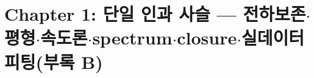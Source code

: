 \begin{abstract}
\noindent 본 문서는 흑연 음극 ICA($dQ/dV$) tail 이론 RB-series 재구성본 Chapter 1$\sim$5 를 한 문서로
통합한 것이다. \textbf{Chapter 1} 은 하나의 관찰(``저온$\cdot$고율에서 ICA peak 꼬리가 길어져 다음 peak 와
겹친다'')에서 출발해 열역학이 무대($V_n$, 평형 target $\xi_{\eq}$)를 깔고 동역학(진행률 완화 $+$
relaxation-length spectrum)이 꼬리의 주역임을 보이고, closure(Plan A/B)$\cdot$심플 근사식$\cdot$
\textbf{실데이터 피팅 워크플로(부록 B — 구 Chapter 6 흡수)}까지 본 장 안에서 닫는다. \textbf{Chapter 2}
는 그 위에서 전지 가역 반응열(평형 전위 온도계수 $=$ reaction entropy)과 비가역 소산열(과전압 flux$\times$force)을
Bernardi 에너지 balance 로 잇는다. \textbf{Chapter 3} 은 mobility $k_j$ 를 미시 forward/backward rate
$r_j^\pm$(Level B)로 확대하고 detailed balance 로 $n_j^{\eff}=RT/(Fw_j)$ 를 고정한다. \textbf{Chapter 4} 는
transition-level entropy production 이 거시 비가역 발열 일반형 $\sum_j n_j^{\eff}I_j\eta_j\ge0$ 으로 정확히
환원됨을 보인다. \textbf{Chapter 5} 는 충전 branch 부호 $s_{\phi,j}^b=-1$ 을 유도하고 히스테리시스를
target 의 이력 의존(metastable branch)으로 설명한다. 통합 참고문헌(33 키)과 통합 Assumption
Ledger(AL-1$\sim$69)는 별도 문건 \texttt{graphite\_ica\_refs\_rebuilt.tex} 에 정리되어 있으며, 본
통합본에도 동일 33 키 bibliography 가 1회 포함된다.
\end{abstract}

\tableofcontents
\newpage


\clearpage
\section{Chapter 1: 단일 인과 사슬 — 전하보존$\cdot$평형$\cdot$속도론$\cdot$spectrum$\cdot$closure$\cdot$실데이터 피팅(부록 B)}\label{chap:ch1}

